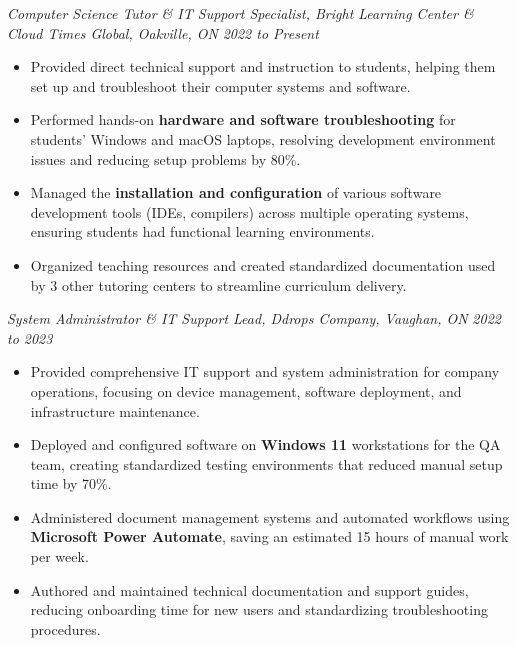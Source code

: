 \documentclass[9pt]{src/developercv}
\begin{document}
  \vspace{1.0\baselineskip}

  \textit{Computer Science Tutor \& IT Support Specialist, Bright Learning
  Center \& Cloud Times Global, Oakville, ON} \hfill \textit{2022 to Present}
  \begin{itemize}[leftmargin=2em, itemsep=0.1em]
    \item Provided direct technical support and instruction to students, helping
    them set up and troubleshoot their computer systems and software.
    \item Performed hands-on \textbf{hardware and software troubleshooting} for
    students' Windows and macOS laptops, resolving development environment
    issues and reducing setup problems by 80\%.
    \item Managed the \textbf{installation and configuration} of various software
    development tools (IDEs, compilers) across multiple operating systems,
    ensuring students had functional learning environments.
    \item Organized teaching resources and created standardized documentation
    used by 3 other tutoring centers to streamline curriculum delivery.
  \end{itemize}

  \vspace{1.0\baselineskip}

  \textit{System Administrator \& IT Support Lead, Ddrops Company, Vaughan, ON}
  \hfill \textit{2022 to 2023}
  \begin{itemize}[leftmargin=2em, itemsep=0.1em]
    \item Provided comprehensive IT support and system administration for company
    operations, focusing on device management, software deployment, and
    infrastructure maintenance.
    \item Deployed and configured software on \textbf{Windows 11} workstations
    for the QA team, creating standardized testing environments that reduced
    manual setup time by 70\%.
    \item Administered document management systems and automated workflows using
    \textbf{Microsoft Power Automate}, saving an estimated 15 hours of manual
    work per week.
    \item Authored and maintained technical documentation and support guides,
    reducing onboarding time for new users and standardizing troubleshooting
    procedures.
  \end{itemize}
\end{document}
